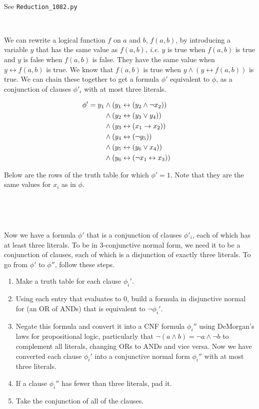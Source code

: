 \

See \verb|Reduction_1082.py|

\

We can rewrite a logical function $f$ on $a$ and $b$, $f(a,b)$, by introducing a variable $y$ that has the same value as $f(a,b)$, {\it i.e.} $y$ is true when $f(a,b)$ is true and $y$ is false when $f(a,b)$ is false.  They have the same value when $y \leftrightarrow f(a,b)$ is true.  We know that $f(a,b)$ is true when $y \land (y \leftrightarrow f(a,b))$ is true.  We can chain these together to get a formula $\phi'$ equivalent to $\phi$, as a conjunction of clauses $\phi'_i$ with at most three literals.  

\begin{align*}
	\phi' = y_1 &\land (y_1 \leftrightarrow (y_2 \land \lnot x_2)) \cr
		& \land (y_2 \leftrightarrow( y_3 \lor y_4 )) \cr
		& \land (y_3 \leftrightarrow( x_1 \to x_2 )) \cr
		& \land (y_4 \leftrightarrow( \lnot y_5 )) \cr
		& \land (y_5 \leftrightarrow( y_6 \lor x_4 )) \cr
		& \land (y_6 \leftrightarrow( \lnot x_1 \leftrightarrow x_3 )) \cr
\end{align*}

Below are the rows of the truth table for which $\phi' = 1$.  Note that they are the same values for $x_i$ as in $\phi$.  

\


\

Now we have a formula $\phi'$ that is a conjunction of clauses $\phi'_i$, each of which has at least three literals.  To be in 3-conjunctive normal form, we need it to be a conjunction of clauses, each of which is a disjunction of exactly three literals.  To go from $\phi'$ to $\phi''$, follow these steps.  

\begin{enumerate}
	\item Make a truth table for each clause $\phi_i'$.  
	\item Using each entry that evaluates to 0, build a formula in disjunctive normal for (an OR of ANDs) that is equivalent to $\lnot \phi_i'$.
	\item Negate this formula and convert it into a CNF formula $\phi_i''$ using DeMorgan's laws for propositional logic, particularly that $\lnot (a \land b) = \lnot a \land \lnot b$ to complement all literals, changing ORs to ANDs and vice versa.  Now we have converted each clause $\phi_i'$ into a conjunctive normal form $\phi_i''$ with at most three literals.  
	\item If a clause $\phi_i''$ has fewer than three literals, pad it.  
	\item Take the conjunction of all of the clauses.  
\end{enumerate}

